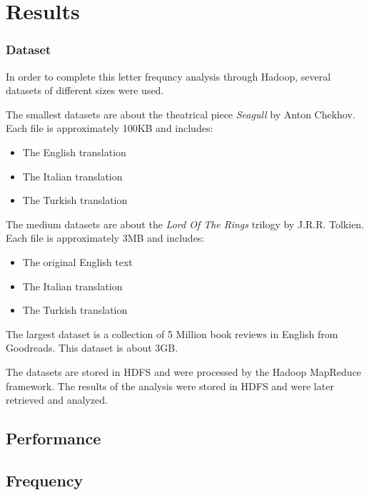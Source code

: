 \chapter{Results}

\subsection{Dataset}
In order to complete this letter frequncy analysis through Hadoop, several datasets of different sizes were used. 

The smallest datasets are about the theatrical piece \textit{Seagull} by Anton Chekhov. Each file is approximately 100KB and includes: 
\begin{itemize}
    \item The English translation
    \item The Italian translation
    \item The Turkish translation
\end{itemize}

The medium datasets are about the \textit{Lord Of The Rings} trilogy by J.R.R. Tolkien. Each file is approximately 3MB and includes: 
\begin{itemize}
    \item The original English text
    \item The Italian translation
    \item The Turkish translation
\end{itemize}

The largest dataset is a collection of 5 Million book reviews in English from Goodreads. This dataset is about 3GB. 
 
The datasets are stored in HDFS and were processed by the Hadoop MapReduce framework. The results of the analysis were stored in HDFS and were later retrieved and analyzed.

\section{Performance}

\section{Frequency}
